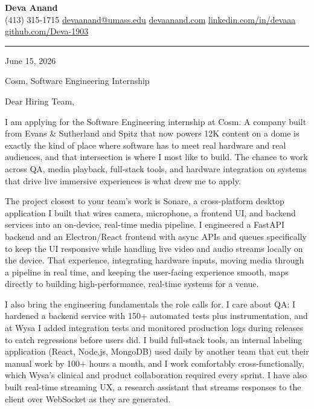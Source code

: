 \documentclass[letterpaper,11pt]{article}
\begin{document}
\begin{center}
    {\LARGE \bfseries \textcolor{ResumeNavy}{Deva Anand}} \\ \vspace{3pt}
    \small
    (413) 315-1715 \enspace\textbar\enspace
    \href{mailto:devaanand@umass.edu}{devaanand@umass.edu} \enspace\textbar\enspace
    \href{https://devaanand.com}{devaanand.com} \enspace\textbar\enspace
    \href{https://linkedin.com/in/devaaa/}{linkedin.com/in/devaaa} \enspace\textbar\enspace
    \href{https://github.com/Deva-1903}{github.com/Deva-1903}
\end{center}
\vspace{2pt}
\hrule
\vspace{10pt}

\noindent June 15, 2026

\noindent Cosm, Software Engineering Internship

\vspace{4pt}
\noindent Dear Hiring Team,

I am applying for the Software Engineering internship at Cosm. A company built from Evans \& Sutherland and Spitz that now powers 12K content on a dome is exactly the kind of place where software has to meet real hardware and real audiences, and that intersection is where I most like to build. The chance to work across QA, media playback, full-stack tools, and hardware integration on systems that drive live immersive experiences is what drew me to apply.

The project closest to your team's work is Sonare, a cross-platform desktop application I built that wires camera, microphone, a frontend UI, and backend services into an on-device, real-time media pipeline. I engineered a FastAPI backend and an Electron/React frontend with async APIs and queues specifically to keep the UI responsive while handling live video and audio streams locally on the device. That experience, integrating hardware inputs, moving media through a pipeline in real time, and keeping the user-facing experience smooth, maps directly to building high-performance, real-time systems for a venue.

I also bring the engineering fundamentals the role calls for. I care about QA: I hardened a backend service with 150+ automated tests plus instrumentation, and at Wysa I added integration tests and monitored production logs during releases to catch regressions before users did. I build full-stack tools, an internal labeling application (React, Node.js, MongoDB) used daily by another team that cut their manual work by 100+ hours a month, and I work comfortably cross-functionally, which Wysa's clinical and product collaboration required every sprint. I have also built real-time streaming UX, a research assistant that streams responses to the client over WebSocket as they are generated.
\end{document}

